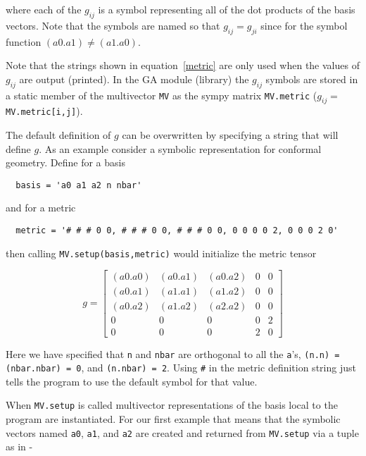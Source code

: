 \documentclass[10pt]{article}
\newcommand{\lbrk}{\left [}
\newcommand{\rbrk}{\right ]}
\newcommand{\T}[1]{\texttt{#1}}
\begin{document}
where each of the $g_{ij}$ is a symbol representing all of the dot
products of the basis vectors. Note that the symbols are named so that
$g_{ij} = g_{ji}$ since for the symbol function
$(a0.a1) \ne (a1.a0)$.

Note that the strings shown in equation~\ref{metric} are only used when the values
of $g_{ij}$ are output (printed).   In the GA module (library)
the $g_{ij}$ symbols are stored in a static member of the multivector
\T{MV} as the sympy matrix \T{MV.metric} ($g_{ij} = $\T{MV.metric[i,j]}).

The default definition of $g$ can be overwritten by specifying a string
that will define $g$. As an example consider a symbolic representation
for conformal geometry. Define for a basis

\begin{lstlisting}
  basis = 'a0 a1 a2 n nbar'
\end{lstlisting}

and for a metric

\begin{lstlisting}
  metric = '# # # 0 0, # # # 0 0, # # # 0 0, 0 0 0 0 2, 0 0 0 2 0'
\end{lstlisting}

then calling \T{MV.setup(basis,metric)} would initialize the metric tensor

  \begin{equation}
  g = \lbrk
  \begin{array}{ccccc}
    (a0.a0) & (a0.a1)  & (a0.a2) & 0 & 0\\
    (a0.a1) & (a1.a1)  & (a1.a2) & 0 & 0\\
    (a0.a2) & (a1.a2)  & (a2.a2) & 0 & 0 \\
    0 & 0 & 0 & 0 & 2 \\
    0 & 0 & 0 & 2 & 0
  \end{array}
  \rbrk
  \end{equation}

Here we have specified that \T{n} and \T{nbar} are orthogonal to all the
\T{a}'s, \T{(n.n) = (nbar.nbar) = 0}, and \T{(n.nbar) = 2}. Using
\T{\#} in the metric definition string just tells the program to use the
default symbol for that value.

When \T{MV.setup} is called multivector representations of the basis local to
the program are instantiated.  For our first example that means that the
symbolic vectors named \T{a0}, \T{a1}, and \T{a2} are created and returned from
\T{MV.setup} via a tuple as in -
\end{document}
